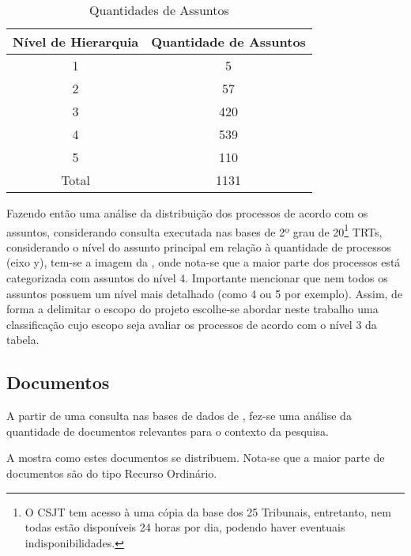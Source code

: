 \begin{table}[]
\centering
\caption{Quantidades de Assuntos}
\label{quantidadesAssuntos}
\begin{tabular}{|c|c|}
\hline
Nível de Hierarquia & Quantidade de Assuntos \\ \hline
1                   & 5                      \\ \hline
2                   & 57                     \\ \hline
3                   & 420                    \\ \hline
4                   & 539                    \\ \hline
5                   & 110                    \\ \hline
Total               & 1131                   \\ \hline
\end{tabular}
\end{table}

Fazendo então uma análise da distribuição dos processos de acordo com os assuntos, considerando consulta executada nas bases de 2º grau de 20\footnote{O CSJT tem acesso à uma cópia da base dos 25 Tribunais, entretanto, nem todas estão disponíveis 24 horas por dia, podendo haver eventuais indisponibilidades.} TRTs, considerando o nível do assunto principal em relação à quantidade de processos (eixo y), tem-se a imagem da , onde nota-se que a maior parte dos processos está categorizada com assuntos do nível 4. Importante mencionar que nem todos os assuntos possuem um nível mais detalhado (como 4 ou 5 por exemplo). Assim, de forma a delimitar o escopo do projeto escolhe-se abordar neste trabalho uma classificação cujo escopo seja avaliar os processos de acordo com o nível 3 da tabela.

%

\subsection{Documentos}

A partir de uma consulta nas bases de dados de , fez-se uma análise da quantidade de documentos relevantes para o contexto da pesquisa.

    
     A  mostra como estes documentos se distribuem. Nota-se que a maior parte de documentos são do tipo Recurso Ordinário.


